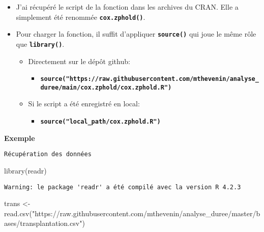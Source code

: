 \documentclass[
  letterpaper,
  DIV=11,
  numbers=noendperiod]{scrartcl}
\newenvironment{Shaded}{\begin{snugshade}}{\end{snugshade}}
\newcommand{\FunctionTok}[1]{\textcolor[rgb]{0.31,0.98,0.48}{#1}}
\newcommand{\NormalTok}[1]{\textcolor[rgb]{0.97,0.97,0.95}{#1}}
\newcommand{\OtherTok}[1]{\textcolor[rgb]{0.31,0.98,0.48}{#1}}
\newcommand{\StringTok}[1]{\textcolor[rgb]{0.95,0.98,0.55}{#1}}
\providecommand{\tightlist}{%
  \setlength{\itemsep}{0pt}\setlength{\parskip}{0pt}}\usepackage{longtable,booktabs,array}
\begin{document}
\begin{itemize}
\tightlist
\item
  J'ai récupéré le script de la fonction dans les archives du CRAN. Elle
  a simplement été renommée \textbf{\texttt{cox.zphold()}}.
\item
  Pour charger la fonction, il suffit d'appliquer
  \textbf{\texttt{source()}} qui joue le même rôle que
  \textbf{\texttt{library()}}.

  \begin{itemize}
  \tightlist
  \item
    Directement sur le dépôt github:

    \begin{itemize}
    \tightlist
    \item
      \textbf{\texttt{source("https://raw.githubusercontent.com/mthevenin/analyse\_duree/main/cox.zphold/cox.zphold.R")}}
    \end{itemize}
  \item
    Si le script a été enregistré en local:

    \begin{itemize}
    \tightlist
    \item
      \textbf{\texttt{source("local\_path/cox.zphold.R")}}
    \end{itemize}
  \end{itemize}
\end{itemize}

\textbf{Exemple}

\begin{codelisting}

\caption{\texttt{Récupération des données}}

\begin{Shaded}
\begin{Highlighting}[]
\FunctionTok{library}\NormalTok{(readr)}
\end{Highlighting}
\end{Shaded}

\end{codelisting}

\begin{verbatim}
Warning: le package 'readr' a été compilé avec la version R 4.2.3
\end{verbatim}

\begin{Shaded}
\begin{Highlighting}[]
\NormalTok{trans }\OtherTok{\textless{}{-}} \FunctionTok{read.csv}\NormalTok{(}\StringTok{"https://raw.githubusercontent.com/mthevenin/analyse\_duree/master/bases/transplantation.csv"}\NormalTok{)}
\end{Highlighting}
\end{Shaded}
\end{document}
